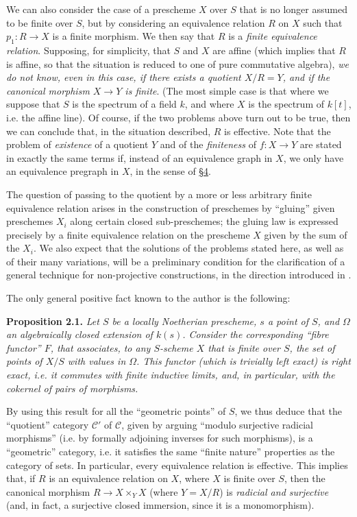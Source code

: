 \documentclass{article}
\newenvironment{itenv}[1]
  {\phantomsection\par\medskip\noindent\textbf{#1.}\itshape}
  {\medskip}
\renewcommand{\cal}[1]{{\mathcal{#1}}}
\newcommand{\oldpage}[1]{\marginpar{\footnotesize$\Big\vert$ \textit{p.~#1}}}
\begin{document}
We can also consider the case of a prescheme $X$ over $S$ that is no longer assumed to be finite over $S$, but by considering an equivalence relation $R$ on $X$ such that $p_1\colon R\to X$ is a finite morphism.
We then say that $R$ is a \emph{finite equivalence relation}.
Supposing, for simplicity, that $S$ and $X$ are affine (which implies that $R$ is affine, so that the situation is reduced to one of pure commutative algebra), \emph{we do not know, even in this case, if there exists a quotient $X/R=Y$, and if the canonical morphism $X\to Y$ is finite}.
(The most simple case is that where we suppose that $S$ is the spectrum of a field $k$, and where $X$ is the spectrum of $k[t]$, i.e. the affine line).
Of course, if the two problems above turn out to be true, then we can conclude that, in the situation described, $R$ is effective.
Note that the problem of \emph{existence} of a quotient $Y$ and of the \emph{finiteness} of $f\colon X\to Y$ are stated in exactly the same terms if, instead of an equivalence graph in $X$, we only have an equivalence pregraph in $X$, in the sense of \hyperref[4]{\S4}.

The question of passing to the quotient by a more or less arbitrary finite equivalence relation arises in the construction of preschemes by ``gluing'' given preschemes $X_i$ along certain closed sub-preschemes;
the gluing law is expressed precisely by a finite equivalence relation on the prescheme $X$ given by the sum of the $X_i$.
We also expect that the solutions of the problems stated here, as well as of their many variations, will be a preliminary condition for the clarification of a general technique for non-projective constructions, in the direction introduced in \cite{2}.

The only general positive fact known to the author is the following:

\begin{itenv}{Proposition 2.1}
\label{proposition2.1}
  Let $S$ be a locally Noetherian prescheme, $s$ a point of $S$, and $\Omega$ an algebraically closed extension of $k(s)$.
  Consider the
\oldpage{212-06}
  corresponding ``fibre functor'' $F$, that associates, to any $S$-scheme $X$ that is finite over $S$, the set of points of $X/S$ with values in $\Omega$.
  This functor (which is trivially left exact) is \emph{right exact}, i.e. it commutes with finite inductive limits, and, in particular, with the cokernel of pairs of morphisms.
\end{itenv}

By using this result for all the ``geometric points'' of $S$, we thus deduce that the ``quotient'' category $\cal{C}'$ of $\cal{C}$, given by arguing ``modulo surjective radicial morphisms'' (i.e. by formally adjoining inverses for such morphisms), is a ``geometric'' category, i.e. it satisfies the same ``finite nature'' properties as the category of sets.
In particular, every equivalence relation is effective.
This implies that, if $R$ is an equivalence relation on $X$, where $X$ is finite over $S$, then the canonical morphism $R\to X\times_Y X$ (where $Y=X/R$) is \emph{radicial and surjective} (and, in fact, a surjective closed immersion, since it is a monomorphism).
\end{document}
